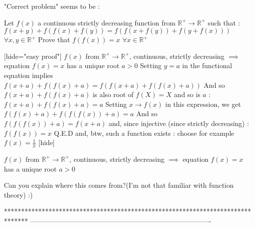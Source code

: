 \begin{solution}
	"Correct problem" seems to be :

Let $f(x)$ a continuous strictly decreasing function from $\mathbb R^+\to \mathbb R^+$ such that :
$f(x+y) + f(f(x)+f(y)) = f(f(x+f(y)) + f(y+f(x)))$ $\forall x,y\in\mathbb R^+$
Prove that $f(f(x))=x$ $\forall x\in\mathbb R^+$

[hide="easy proof"]
$f(x)$ from $\mathbb R^+\to \mathbb R^+$, continuous, strictly decreasing $\implies$ equation $f(x)=x$ has a unique root $a>0$
Setting $y=a$ in the functional equation implies $f(x+a) + f(f(x)+a) = f(f(x+a) + f(f(x)+a))$
And so $f(x+a) + f(f(x)+a)$ is also root of $f(X)=X$ and so is $a$ :
$f(x+a) + f(f(x)+a)=a$
Setting $x\to f(x)$ in this expression, we get $f(f(x)+a) + f(f(f(x))+a)=a$
And so $f(f(f(x))+a)=f(x+a)$ and, since injective (since strictly decreasing) : $\boxed{f(f(x))=x}$
Q.E.D
and, btw, such a function exists : choose for example $f(x)=\frac 1x$
[\/hide]
\end{solution}



\begin{solution}
	\begin{tcolorbox}
$f(x)$ from $\mathbb R^+\to \mathbb R^+$, continuous, strictly decreasing $\implies$ equation $f(x)=x$ has a unique root $a>0$
\end{tcolorbox}
Can you explain where this comes from?(I'm not that familiar with function theory) :)
\end{solution}



*******************************************************************************
-------------------------------------------------------------------------------

